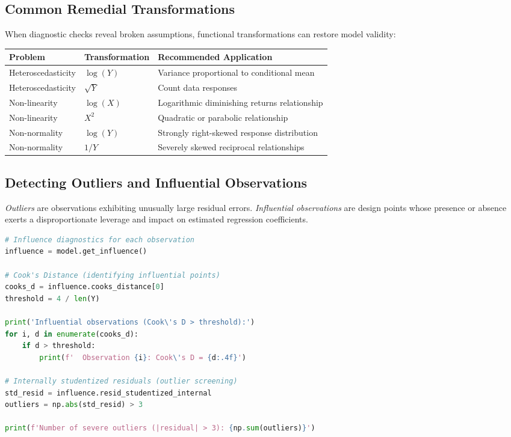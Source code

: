 \subsection{Common Remedial Transformations}

When diagnostic checks reveal broken assumptions, functional transformations can restore model validity:

\begin{center}
	\begin{tabular}{|l|l|l|}\hline
		\textbf{Problem} & \textbf{Transformation} & \textbf{Recommended Application} \\\hline
		Heteroscedasticity & $\log(Y)$ & Variance proportional to conditional mean \\\hline
		Heteroscedasticity & $\sqrt{Y}$ & Count data responses \\\hline
		Non-linearity & $\log(X)$ & Logarithmic diminishing returns relationship \\\hline
		Non-linearity & $X^2$ & Quadratic or parabolic relationship \\\hline
		Non-normality & $\log(Y)$ & Strongly right-skewed response distribution \\\hline
		Non-normality & $1/Y$ & Severely skewed reciprocal relationships \\\hline
	\end{tabular}
\end{center}

\subsection{Detecting Outliers and Influential Observations}

\emph{Outliers} are observations exhibiting unusually large residual errors. \emph{Influential observations} are design points whose presence or absence exerts a disproportionate leverage and impact on estimated regression coefficients.

\begin{lstlisting}[language=Python]
# Influence diagnostics for each observation
influence = model.get_influence()

# Cook's Distance (identifying influential points)
cooks_d = influence.cooks_distance[0]
threshold = 4 / len(Y)

print('Influential observations (Cook\'s D > threshold):')
for i, d in enumerate(cooks_d):
    if d > threshold:
        print(f'  Observation {i}: Cook\'s D = {d:.4f}')

# Internally studentized residuals (outlier screening)
std_resid = influence.resid_studentized_internal
outliers = np.abs(std_resid) > 3

print(f'Number of severe outliers (|residual| > 3): {np.sum(outliers)}')
\end{lstlisting}

